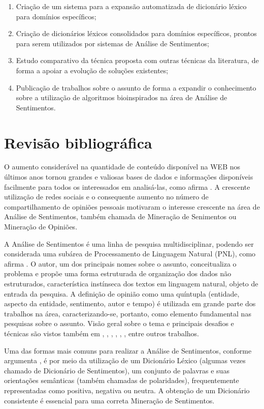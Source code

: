 \documentclass[a4paper,11pt]{article}
\begin{document}
\begin{enumerate}
\item Criação de um sistema para a expansão automatizada de dicionário léxico para domínios específicos;
\item Criação de dicionários léxicos consolidados para domínios específicos, prontos para serem utilizados por sistemas de Análise de Sentimentos;
\item Estudo comparativo da técnica proposta com outras técnicas da literatura, de forma a apoiar a evolução de soluções existentes;
\item Publicação de trabalhos sobre o assunto de forma a expandir o conhecimento sobre a utilização de algoritmos bioinspirados na área de Análise de Sentimentos.

\end{enumerate}

\section{Revisão bibliográfica}
\label{sec:bibl}
O aumento considerável na quantidade de conteúdo disponível na WEB nos últimos anos tornou grandes e valiosas bases de dados e informações disponíveis facilmente para todos os interessados em analisá-las, como afirma \cite{kdir16}. A crescente utilização de redes sociais e o consequente aumento no número de compartilhamento de opiniões pessoais motivaram o interesse crescente na área de Análise de Sentimentos, também chamada de Mineração de Senimentos ou Mineração de Opiniões. 

A Análise de Sentimentos é uma linha de pesquisa multidisciplinar, podendo ser considerada uma subárea de Processamento de Linguagem Natural (PNL), como afirma \cite{liu2010multifaceted}. O autor, um dos principais nomes sobre o assunto, conceitualiza o problema e propõe uma forma estruturada de organização dos dados não estruturados, característica instínseca dos textos em linguagem natural, objeto de entrada da pesquisa. A definição de opinião como uma quíntupla (entidade, aspecto da entidade, sentimento, autor e tempo) é utilizada em grande parte dos trabalhos na área, caracterizando-se, portanto, como elemento fundamental nas pesquisas sobre o assunto. Visão geral sobre o tema e principais desafios e técnicas são vistos também em \cite{mohammad2016challenges}, \cite{ghaleb2016survey}, \cite{kdir16}, \cite{taboada2011lexicon}, \cite{bandhakavi2016lexicon}, \cite{Alessia}, entre outros trabalhos.

Uma das formas mais comuns para realizar a Análise de Sentimentos, conforme argumenta \cite{kdir16}, é por meio da utilização de um Dicionário Léxico (algumas vezes chamado de Dicionário de Sentimentos), um conjunto de palavras e suas orientações semânticas (também chamadas de polaridades), frequentemente representadas como positiva, negativa ou neutra. A obtenção de um Dicionário consistente é essencial para uma correta Mineração de Sentimentos. 
\end{document}
